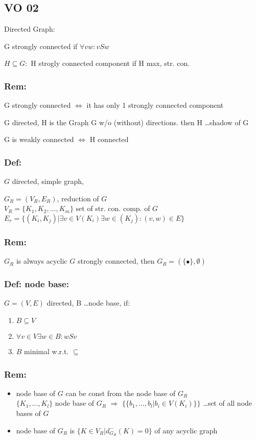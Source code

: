 \subsection{VO 02}

Directed Graph:

G strongly connected if $\forall vw : vSw$

$H \subseteq G: $ H strogly connected component if H max, str. con.

\subsubsection*{Rem:}
G strongly connected $\iff$ it has only 1 strongly connected component

G directed, H is the Graph G w/o (without) directions. then 
H \ldots shadow of G

G is weakly connected $\iff$ H connected

\subsubsection*{Def:}
$G$ directed, simple graph, 


$G_R = (V_R, E_R)$, reduction of $G$ \\
$V_R = \{K_1, K_2, \ldots , K_m\}$ set of str. con. comp. of $G$ \\
$E_r = \{ (K_i, K_j) | \exists v \in V(K_i) \exists w \in (K_j) : (v,w) \in E \}$

\subsubsection*{Rem:}
$G_R$ is always acyclic
$G$ strongly connected, then $G_R = ( \{ \bullet \}, \emptyset )$

\subsubsection*{Def: node base:}
$G=(V,E) $ directed, B \ldots node base, if:
\begin{enumerate}
\item $B \subseteq V$ 
\item $\forall v \in V \exists w \in B : wSv$
\item $B$ minimal w.r.t. $\subseteq$
\end{enumerate}

\subsubsection*{Rem: }
\begin{itemize}
\item node base of $G$ can be const from the node base of $G_R$ \\
	$\{K_1, \ldots , K_l\} $ node base of $G_R$ $\Rightarrow$ 
	$\{\{b_1, \ldots , b_l | b_i \in V(K_i)\}\}$ \ldots set of all node bases of $G$

\item node base of $G_R$ is $\{K \in V_R | d_{G_R}^{-}(K) = 0 \}$ of any acyclic graph
\end{itemize}




